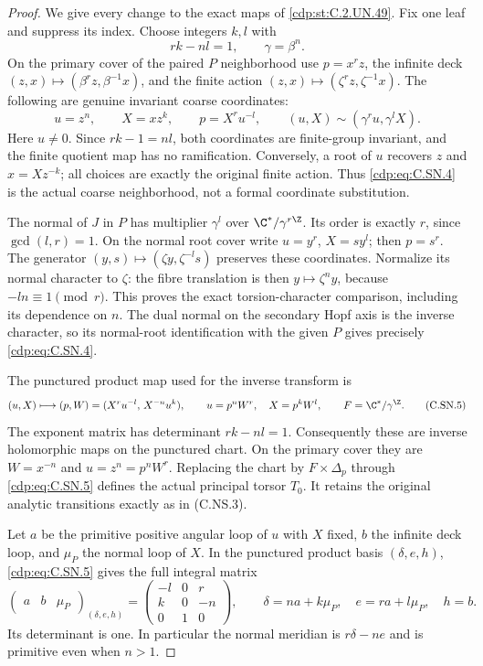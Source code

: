 \begin{proof}
We give every change to the exact maps of \ref{cdp:st:C.2.UN.49}.
Fix one leaf and suppress its index. Choose integers
$k,l$ with
\[
                         rk-nl=1,\qquad \gamma=\beta^n.
                                                        \tag{C.SN.3}\label{cdp:eq:C.SN.3}
\]
On the primary cover of the paired $P$ neighborhood
use $p=x^rz$, the infinite deck
$(z,x)\mapsto(\beta^rz,\beta^{-1}x)$, and the finite
action $(z,x)\mapsto(\zeta^rz,\zeta^{-1}x)$.
The following are genuine invariant coarse coordinates:
\[
 u=z^n,\qquad X=xz^k,\qquad
 p=X^ru^{-l},\qquad
 (u,X)\sim(\gamma^ru,\gamma^lX).
                                                        \tag{C.SN.4}\label{cdp:eq:C.SN.4}
\]
Here $u\ne0$. Since $rk-1=nl$, both coordinates
are finite-group invariant, and the finite quotient
map has no ramification. Conversely, a root of $u$
recovers $z$ and $x=Xz^{-k}$; all choices are exactly
the original finite action. Thus \eqref{cdp:eq:C.SN.4} is the
actual coarse neighborhood, not a formal coordinate
substitution.

The normal of $J$ in $P$ has multiplier $\gamma^l$
over $\C^*/\gamma^{r\Z}$. Its order is exactly $r$,
since $\gcd(l,r)=1$. On the normal root cover write
$u=y^r$, $X=s y^l$; then $p=s^r$.
The generator $(y,s)\mapsto(\zeta y,\zeta^{-l}s)$
preserves these coordinates. Normalize its normal
character to $\zeta$: the fibre translation is then
$y\mapsto\zeta^n y$, because $-ln\equiv1\pmod r$.
This proves the exact torsion-character comparison,
including its dependence on $n$.
The dual normal on the secondary Hopf axis is
the inverse character, so its normal-root
identification with the given $P$ gives precisely
\eqref{cdp:eq:C.SN.4}.

The punctured product map used for the inverse
transform is
\[
 (u,X)\longmapsto(p,W)
       =(X^ru^{-l},\,X^{-n}u^k),\qquad
 u=p^nW^r,\quad X=p^kW^l,\qquad
                       F=\C^*/\gamma^{\Z}.               \tag{C.SN.5}\label{cdp:eq:C.SN.5}
\]
The exponent matrix has determinant $rk-nl=1$.
Consequently these are inverse holomorphic maps
on the punctured chart. On the primary cover
they are $W=x^{-n}$ and $u=z^n=p^nW^r$.
Replacing the chart by $F\times\Delta_p$ through
\eqref{cdp:eq:C.SN.5} defines the actual principal torsor $T_0$.
It retains the original analytic transitions
exactly as in (C.NS.3).

Let $a$ be the primitive positive angular loop of
$u$ with $X$ fixed, $b$ the infinite deck loop,
and $\mu_P$ the normal loop of $X$. In the
punctured product basis $(\delta,e,h)$,
\eqref{cdp:eq:C.SN.5} gives the full integral matrix
\[
 \begin{pmatrix}a&b&\mu_P\end{pmatrix}_{(\delta,e,h)}
   =
 \begin{pmatrix}
   -l&0&r\\
    k&0&-n\\
    0&1&0
 \end{pmatrix},
 \qquad
 \delta=n a+k\mu_P,\quad e=r a+l\mu_P,\quad h=b.
                                                        \tag{C.SN.6}\label{cdp:eq:C.SN.6}
\]
Its determinant is one. In particular the normal
meridian is $r\delta-ne$ and is primitive even
when $n>1$.


\end{proof}
